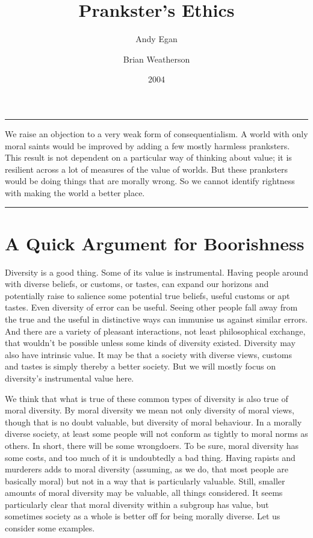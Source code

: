 \documentclass[
  10pt,
  letterpaper,
  DIV=11,
  numbers=noendperiod,
  twoside]{scrartcl}
\title{Prankster's Ethics}
\author{Andy Egan \and Brian Weatherson}
\date{2004}
\renewenvironment{abstract}
 {\vspace{-1.25cm}
 \quotation\small\noindent\rule{\linewidth}{.5pt}\par\smallskip
 \noindent }
 {\par\noindent\rule{\linewidth}{.5pt}\endquotation}
\begin{document}
\maketitle
\begin{abstract}
We raise an objection to a very weak form of consequentialism. A world
with only moral saints would be improved by adding a few mostly harmless
pranksters. This result is not dependent on a particular way of thinking
about value; it is resilient across a lot of measures of the value of
worlds. But these pranksters would be doing things that are morally
wrong. So we cannot identify rightness with making the world a better
place.
\end{abstract}


\section{A Quick Argument for
Boorishness}\label{a-quick-argument-for-boorishness}

Diversity is a good thing. Some of its value is instrumental. Having
people around with diverse beliefs, or customs, or tastes, can expand
our horizons and potentially raise to salience some potential true
beliefs, useful customs or apt tastes. Even diversity of error can be
useful. Seeing other people fall away from the true and the useful in
distinctive ways can immunise us against similar errors. And there are a
variety of pleasant interactions, not least philosophical exchange, that
wouldn't be possible unless some kinds of diversity existed. Diversity
may also have intrinsic value. It may be that a society with diverse
views, customs and tastes is simply thereby a better society. But we
will mostly focus on diversity's instrumental value here.

We think that what is true of these common types of diversity is also
true of moral diversity. By moral diversity we mean not only diversity
of moral views, though that is no doubt valuable, but diversity of moral
behaviour. In a morally diverse society, at least some people will not
conform as tightly to moral norms as others. In short, there will be
some wrongdoers. To be sure, moral diversity has some costs, and too
much of it is undoubtedly a bad thing. Having rapists and murderers adds
to moral diversity (assuming, as we do, that most people are basically
moral) but not in a way that is particularly valuable. Still, smaller
amounts of moral diversity may be valuable, all things considered. It
seems particularly clear that moral diversity within a subgroup has
value, but sometimes society as a whole is better off for being morally
diverse. Let us consider some examples.
\end{document}
